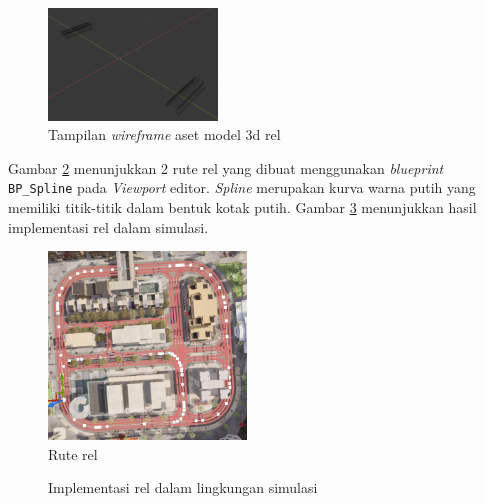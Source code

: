 \begin{figure}[!h]
    \centering
    \includegraphics[width=0.4\textwidth]{resources/chapter-4/rel-mesh.png}
    \caption{Tampilan \textit{wireframe} aset model 3d rel}
    \label{fig:rel-mesh}
\end{figure}

Gambar \ref{fig:rel-route} menunjukkan 2 rute rel yang dibuat menggunakan
\textit{blueprint} \verb|BP_Spline| pada \textit{Viewport} editor.
\textit{Spline} merupakan kurva warna putih yang memiliki titik-titik dalam
bentuk kotak putih. Gambar \ref{fig:rel} menunjukkan hasil implementasi rel
dalam simulasi.

\begin{figure}[!h]
    \centering
    \includegraphics[width=0.47\textwidth]{resources/chapter-4/rel-route.png}
    \caption{Rute rel}
    \label{fig:rel-route}
\end{figure}

\begin{figure}[!h]
    \centering
    \hfill
    \caption{Implementasi rel dalam lingkungan simulasi}
    \label{fig:rel}
\end{figure}

